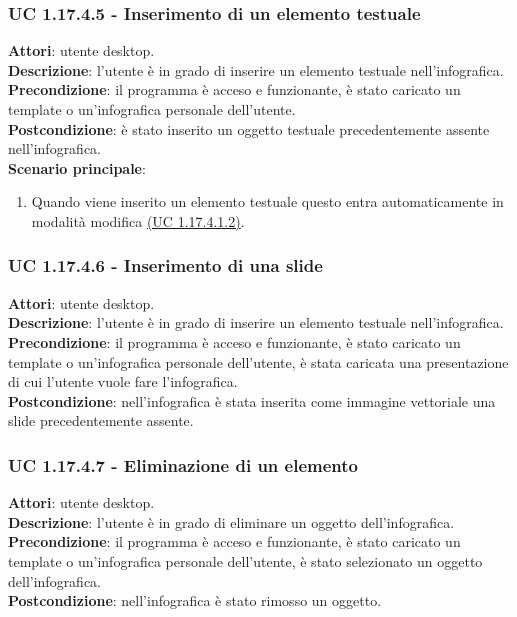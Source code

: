 \subsubsection{UC 1.17.4.5 - Inserimento di un elemento testuale}{
	\label{uc1.17.4.5}
	\textbf{Attori}: utente desktop. \\
	\textbf{Descrizione}: l'utente è in grado di inserire un elemento testuale nell'infografica. \\
	\textbf{Precondizione}: il programma è acceso e funzionante, è stato caricato un template o un'infografica personale dell'utente.	\\
	\textbf{Postcondizione}: è stato inserito un oggetto testuale precedentemente assente nell'infografica.	\\
	\textbf{Scenario principale}:
	\begin{enumerate}
		\item Quando viene inserito un elemento testuale questo entra automaticamente in modalità modifica \hyperref[uc1.17.4.1.2]{(UC 1.17.4.1.2)}.
	\end{enumerate}
	}
\subsubsection{UC 1.17.4.6 - Inserimento di una slide}{
	\label{uc1.17.4.6}
	\textbf{Attori}: utente desktop. \\
	\textbf{Descrizione}: l'utente è in grado di inserire un elemento testuale nell'infografica. \\
	\textbf{Precondizione}: il programma è acceso e funzionante, è stato caricato un template o un'infografica personale dell'utente, è stata caricata una presentazione di cui l'utente vuole fare l'infografica.	\\
	\textbf{Postcondizione}: nell'infografica è stata inserita come immagine vettoriale una slide precedentemente assente.
	}
\subsubsection{UC 1.17.4.7 - Eliminazione di un elemento}{
	\label{uc1.17.4.7}
	\textbf{Attori}: utente desktop. \\
	\textbf{Descrizione}: l'utente è in grado di eliminare un oggetto dell'infografica. \\
	\textbf{Precondizione}: il programma è acceso e funzionante, è stato caricato un template o un'infografica personale dell'utente, è stato selezionato un oggetto dell'infografica.	\\
	\textbf{Postcondizione}: nell'infografica è stato rimosso un oggetto.
	}
